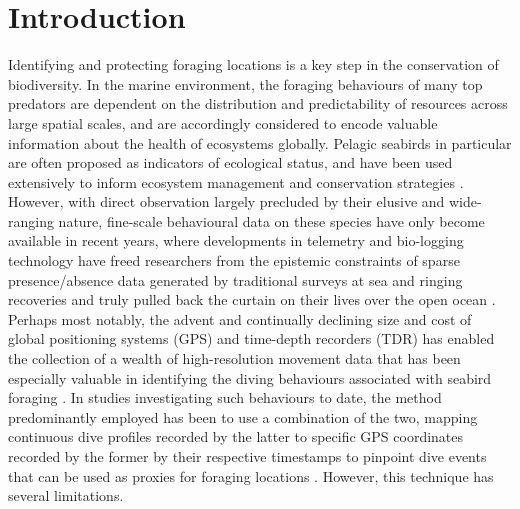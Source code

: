 \documentclass[11pt]{article}
\begin{document}
    
    \section{Introduction}
    
    Identifying and protecting foraging locations is a key step in the conservation of biodiversity. In the marine environment, the foraging behaviours of many top predators are dependent on the distribution and predictability of resources across large spatial scales, and are accordingly considered to encode valuable information about the health of ecosystems globally. Pelagic seabirds in particular are often proposed as indicators of ecological status, and have been used extensively to inform ecosystem management and conservation strategies \citep{thaxter2012seabird,einoder2009review,mallory2010seabirds,paleczny2015population}. However, with direct observation largely precluded by their elusive and wide-ranging nature, fine-scale behavioural data on these species have only become available in recent years, where developments in telemetry and bio-logging technology have freed researchers from the epistemic constraints of sparse presence/absence data generated by traditional surveys at sea and ringing recoveries and truly pulled back the curtain on their lives over the open ocean \citep{rutz2009new,guilford2009migration,maclean2013evaluating,bograd2010biologging}. Perhaps most notably, the advent and continually declining size and cost of global positioning systems (GPS) and time-depth recorders (TDR) has enabled the collection of a wealth of high-resolution movement data that has been especially valuable in identifying the diving behaviours associated with seabird foraging \citep{guilford2008gps,thaxter2012seabird}. In studies investigating such behaviours to date, the method predominantly employed has been to use a combination of the two, mapping continuous dive profiles recorded by the latter to specific GPS coordinates recorded by the former by their respective timestamps to pinpoint dive events that can be used as proxies for foraging locations \citep{wanless1997use,shoji2015foraging,dean2013behavioural}. However, this technique has several limitations. 
    
\end{document}
